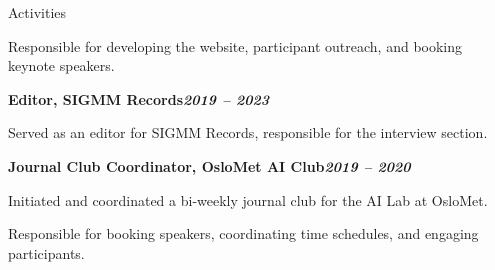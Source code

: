 \begin{rubric}{Activities}
\begin{compactitem}
    \item Responsible for developing the website, participant outreach, and booking keynote speakers.
    \vspace{-12pt}
\end{compactitem}
%
\entry*[]%
\textbf{Editor, SIGMM Records\hfill\textit{2019 -- 2023}} \par
\begin{compactitem}
    \item Served as an editor for SIGMM Records, responsible for the interview section.
    \vspace{-12pt}
\end{compactitem}
%
\entry*[]%
\textbf{Journal Club Coordinator, OsloMet AI Club\hfill\textit{2019 -- 2020}} \par
\begin{compactitem}
    \item Initiated and coordinated a bi-weekly journal club for the AI Lab at OsloMet.
    \item Responsible for booking speakers, coordinating time schedules, and engaging participants.
    \vspace{-12pt}
\end{compactitem}
\end{rubric}
